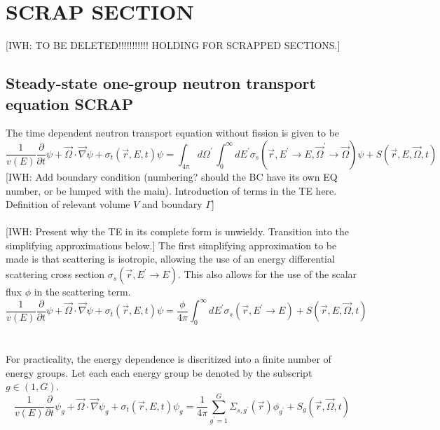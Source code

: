 \documentclass{article}
\newcommand{\vr}{\vec{r}}
\newcommand{\vO}{\vec{\Omega}}
\newcommand{\vgrad}{\vec{\nabla}}
\newcommand{\sigt}{\sigma_t}
\newcommand{\sigs}{\sigma_s}
\begin{document}
\section{SCRAP SECTION}
{\color{red}[IWH: TO BE DELETED!!!!!!!!!!! HOLDING FOR SCRAPPED SECTIONS.]}

\subsection{Steady-state one-group neutron transport equation SCRAP}

The time dependent neutron transport equation without fission is given to be 
\begin{equation}
\frac{1}{v(E)} \frac{\partial}{\partial t}\psi + \vO \cdot \vgrad \psi + \sigt(\vr,E,t) \psi = \int_{4 \pi} d \Omega^\prime \, \int_0^\infty dE^\prime \sigs(\vr,E^\prime \to E, \vO^\prime \to \vO) \psi + S(\vr,E,\vO,t) 
\end{equation}
{\color{red}[IWH: Add boundary condition (numbering? should the BC have its own EQ number, or be lumped with the main). Introduction of terms in the TE here. Definition of relevant volume $V$ and boundary $\Gamma$]}
\\ \\
{\color{red}[IWH: Present why the TE in its complete form is unwieldy. Transition into the simplifying approximations below.]}
The first simplifying approximation to be made is that scattering is isotropic, allowing the use of an energy differential scattering cross section $\sigs(\vr,E^\prime \to E)$. This also allows for the use of the scalar flux $\phi$ in the scattering term.
\begin{equation}
\frac{1}{v(E)} \frac{\partial}{\partial t}\psi + \vO \cdot \vgrad \psi + \sigt(\vr,E,t) \psi = \frac{\phi}{4 \pi} \int_0^\infty dE^\prime \sigs(\vr,E^\prime \to E) + S(\vr,E,\vO,t) 
\end{equation}
 \\ \\
For practicality, the energy dependence is discritized into a finite number of energy groups. Let each each energy group be denoted by the subscript $g \in (1,G)$. 
\begin{equation}
\frac{1}{v(E)} \frac{\partial}{\partial t}\psi_g + \vO \cdot \vgrad \psi_g + \sigt(\vr,E,t) \psi_g = \frac{1}{4 \pi} \sum_{g^\prime=1}^G  \Sigma_{s,g^\prime}(\vr) \phi_{g^\prime} + S_g(\vr,\vO,t) 
\end{equation}
\end{document}
